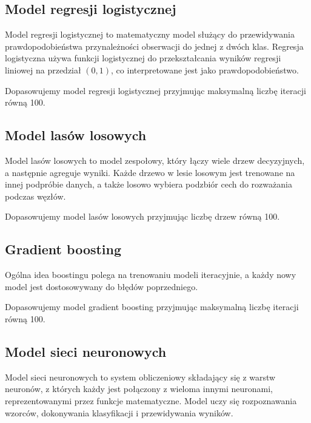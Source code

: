 \documentclass[12pt]{article}
\begin{document}
	\subsection{Model regresji logistycznej}\label{subsec:model-regresji-logistycznej}
	Model regresji logistycznej to matematyczny model służący do przewidywania prawdopodobieństwa przynależności obserwacji do jednej z dwóch klas. Regresja logistyczna używa funkcji logistycznej do przekształcania wyników regresji liniowej na przedział $(0,1)$, co interpretowane jest jako prawdopodobieństwo.
	
	\vspace{0.25cm}
	
	Dopasowujemy model regresji logistycznej przyjmując maksymalną liczbę iteracji równą 100.
	
	\subsection{Model lasów losowych}\label{subsec:model-lasów-losowych}
	Model lasów losowych to model zespołowy, który łączy wiele drzew decyzyjnych, a następnie agreguje wyniki. Każde drzewo w lesie losowym jest trenowane na innej podpróbie danych, a także losowo wybiera podzbiór cech do rozważania podczas węzłów. 
	
	\vspace{0.25cm}
	
	Dopasowujemy model lasów losowych przyjmując liczbę drzew równą 100.
	
	\subsection{Gradient boosting}\label{subsec:gradient-boosting}
	Ogólna idea boostingu polega na trenowaniu modeli iteracyjnie, a każdy nowy model jest dostosowywany do błędów poprzedniego.
	
	\vspace{0.25cm}
	
	Dopasowujemy model gradient boosting przyjmując maksymalną liczbę iteracji równą 100.
	
	\subsection{Model sieci neuronowych}\label{subsec:model-sieci-neuronowych}
	Model sieci neuronowych to system obliczeniowy składający się z warstw neuronów, z których każdy jest połączony z wieloma innymi neuronami, reprezentowanymi przez funkcje matematyczne. Model uczy się rozpoznawania wzorców, dokonywania klasyfikacji i przewidywania wyników.
	
\end{document}
